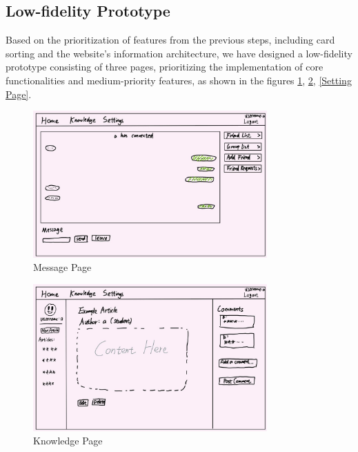 \documentclass[12pt]{article}
\begin{document}
\subsection{Low-fidelity Prototype}
    \hspace{2em}Based on the prioritization of features from the previous steps, including card sorting and the website's information architecture, we have designed a low-fidelity prototype consisting of three pages, prioritizing the implementation of core functionalities and medium-priority features, as shown in the figures \ref{Message Page}, \ref{Knowledge Page}, \ref{Setting Page}.
            
    \begin{figure}[H]
        \centering
        \includegraphics[width=0.8\textwidth]{graphs/message_page.jpg}
        \caption{Message Page}
        \label{Message Page}
    \end{figure}

    \begin{figure}[H]
        \centering
        \includegraphics[width=0.8\textwidth]{graphs/knowledge_page.jpg}
        \caption{Knowledge Page}
        \label{Knowledge Page}
    \end{figure}
\end{document}
